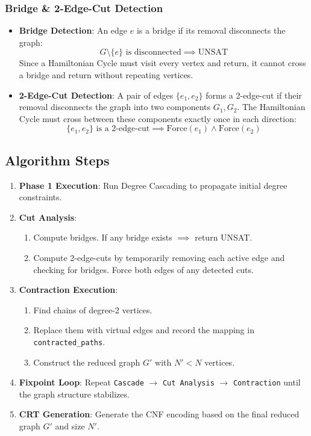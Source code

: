 \subsubsection{Bridge \& 2-Edge-Cut Detection}
\begin{itemize}
    \item \textbf{Bridge Detection}: An edge $e$ is a bridge if its removal disconnects the graph:
    \begin{equation}
        G \setminus \{e\} \text{ is disconnected} \implies \text{UNSAT}
    \end{equation}
    Since a Hamiltonian Cycle must visit every vertex and return, it cannot cross a bridge and return without repeating vertices.
    \item \textbf{2-Edge-Cut Detection}: A pair of edges $\{e_1, e_2\}$ forms a 2-edge-cut if their removal disconnects the graph into two components $G_1, G_2$.
    The Hamiltonian Cycle must cross between these components exactly once in each direction:
    \begin{equation}
        \{e_1, e_2\} \text{ is a 2-edge-cut} \implies \text{Force}(e_1) \land \text{Force}(e_2)
    \end{equation}
\end{itemize}

\subsection{Algorithm Steps}
\begin{enumerate}
    \item \textbf{Phase 1 Execution}: Run Degree Cascading to propagate initial degree constraints.
    \item \textbf{Cut Analysis}:
    \begin{enumerate}
        \item Compute bridges. If any bridge exists $\implies$ return UNSAT.
        \item Compute 2-edge-cuts by temporarily removing each active edge and checking for bridges. Force both edges of any detected cuts.
    \end{enumerate}
    \item \textbf{Contraction Execution}:
    \begin{enumerate}
        \item Find chains of degree-2 vertices.
        \item Replace them with virtual edges and record the mapping in \texttt{contracted\_paths}.
        \item Construct the reduced graph $G'$ with $N' < N$ vertices.
    \end{enumerate}
    \item \textbf{Fixpoint Loop}: Repeat \texttt{Cascade} $\rightarrow$ \texttt{Cut Analysis} $\rightarrow$ \texttt{Contraction} until the graph structure stabilizes.
    \item \textbf{CRT Generation}: Generate the CNF encoding based on the final reduced graph $G'$ and size $N'$.
\end{enumerate}

